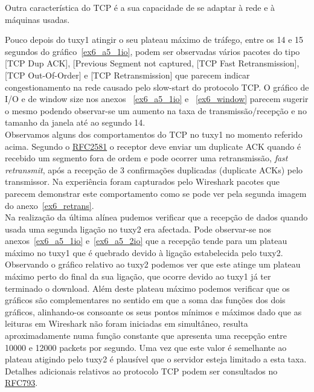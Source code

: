 \documentclass[11pt,a4paper,reqno]{report}
\numberwithin{equation}{section}
\begin{document}
Outra característica do TCP é a sua capacidade de se adaptar à rede e à máquinas usadas.

Pouco depois do tuxy1 atingir o seu plateau máximo de tráfego, entre os 14 e 15 segundos do gráfico~\ref{ex6_a5_1io}, podem ser observadas vários pacotes do tipo [TCP Dup ACK], [Previous Segment not captured, [TCP Fast Retransmission], [TCP Out-Of-Order] e [TCP Retransmission] que parecem indicar congestionamento na rede causado pelo slow-start do protocolo TCP. O gráfico de I/O e de window size nos anexos ~\ref{ex6_a5_1io} e ~\ref{ex6_window} parecem sugerir o mesmo podendo observar-se um aumento na taxa de transmissão/recepção e no tamanho da janela até ao segundo 14.\\

Observamos alguns dos comportamentos do TCP no tuxy1 no momento referido acima. Segundo o \href{http://www.ietf.org/rfc/rfc2581.txt}{RFC2581} o receptor deve enviar um duplicate ACK quando é recebido um segmento fora de ordem e pode ocorrer uma retransmissão, \emph{fast retransmit}, após a recepção de 3 confirmações duplicadas (duplicate ACKs) pelo transmissor. Na experiência foram capturados pelo Wireshark pacotes que parecem demonstrar este comportamento como se pode ver pela segunda imagem do anexo~\ref{ex6_retrans}.\\

Na realização da última alínea pudemos verificar que a recepção de dados quando usada uma segunda ligação no tuxy2 era afectada. Pode observar-se nos anexos~\ref{ex6_a5_1io} e~\ref{ex6_a5_2io} que a recepção  tende para um plateau máximo no tuxy1 que é quebrado devido à ligação estabelecida pelo tuxy2. Observando o gráfico relativo ao tuxy2 podemos ver que este atinge um plateau máximo perto do final da sua ligação, que ocorre devido ao tuxy1 já ter terminado o download. Além deste plateau máximo podemos verificar que os gráficos são complementares no sentido em que a soma das funções dos dois gráficos, alinhando-os consoante os seus pontos mínimos e máximos dado que as leituras em Wireshark não foram iniciadas em simultâneo, resulta aproximadamente numa função constante que apresenta uma recepção entre 10000 e 12000 packets por segundo. Uma vez que este valor é semelhante ao plateau atigindo pelo tuxy2 é plausível que o servidor esteja limitado a esta taxa.\\

Detalhes adicionais relativos ao protocolo TCP podem ser consultados no \href{https://www.ietf.org/rfc/rfc793.txt}{RFC793}.
\end{document}
